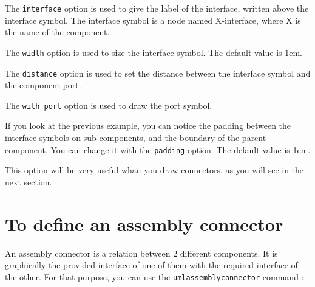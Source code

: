 \documentclass[a4paper,11pt]{report}
\newcommand{\inputTikZ}[1]{%
  }%
\newcommand{\inputTikZ}[1]{%
    \texttt{[image: fig/\#1.pdf]}%
  }%
\begin{document}
\medskip

The {\tt interface} option is used to give the label of the interface, written above the interface symbol.
The interface symbol is a node named X-interface, where X is the name of the component.

\medskip

The {\tt width} option is used to size the interface symbol. The default value is 1em.

\medskip

The {\tt distance} option is used to set the distance between the interface symbol and the component port. 

\medskip

The {\tt with port} option is used to draw the port symbol.

\medskip

If you look at the previous example, you can notice the padding between the interface symbols on sub-components, and the boundary of the parent component. You can change it with the {\tt padding} option. The default value is 1cm. 

\medskip

\begin{minipage}{0.45\textwidth}

\end{minipage}
\begin{minipage}{0.55\textwidth}
\begin{center}
\inputTikZ{componentinterfacepadding}
\end{center}
\end{minipage}

\medskip

This option will be very useful whan you draw connectors, as you will see in the next section.

\section{To define an assembly connector}

An assembly connector is a relation between 2 different components. It is graphically the provided interface of one of them with the required interface of the other.
For that purpose, you can use the {\tt umlassemblyconnector} command :

\medskip

\begin{minipage}{0.45\textwidth}

\end{minipage}
\begin{minipage}{0.55\textwidth}
\begin{center}
\inputTikZ{componentassemblyconnector}
\end{center}
\end{minipage}
\end{document}
